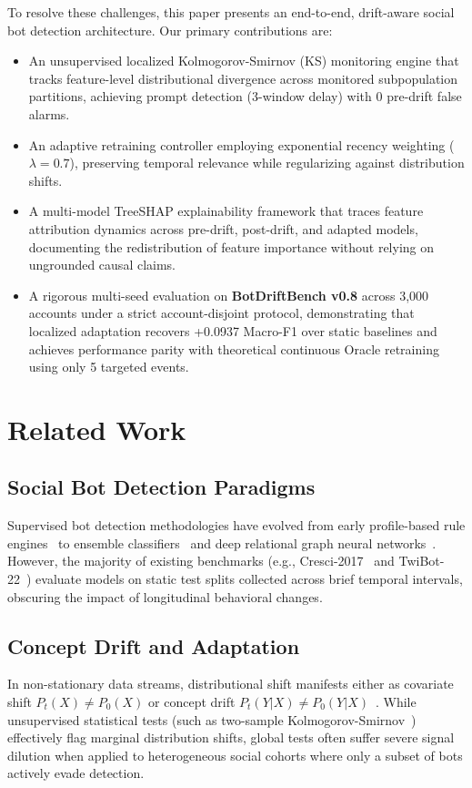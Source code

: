 \documentclass[journal]{IEEEtran}
\begin{document}
To resolve these challenges, this paper presents an end-to-end, drift-aware social bot detection architecture. Our primary contributions are:
\begin{itemize}
    \item An unsupervised localized Kolmogorov-Smirnov (KS) monitoring engine that tracks feature-level distributional divergence across monitored subpopulation partitions, achieving prompt detection (3-window delay) with 0 pre-drift false alarms.
    \item An adaptive retraining controller employing exponential recency weighting ($\lambda = 0.7$), preserving temporal relevance while regularizing against distribution shifts.
    \item A multi-model TreeSHAP explainability framework that traces feature attribution dynamics across pre-drift, post-drift, and adapted models, documenting the redistribution of feature importance without relying on ungrounded causal claims.
    \item A rigorous multi-seed evaluation on \textbf{BotDriftBench v0.8} across 3,000 accounts under a strict account-disjoint protocol, demonstrating that localized adaptation recovers +0.0937 Macro-F1 over static baselines and achieves performance parity with theoretical continuous Oracle retraining using only 5 targeted events.
\end{itemize}

\section{Related Work}
\subsection{Social Bot Detection Paradigms}
Supervised bot detection methodologies have evolved from early profile-based rule engines~\cite{varol2017online} to ensemble classifiers~\cite{chen2016xgboost} and deep relational graph neural networks~\cite{feng2021botrgcn,feng2022twibot}. However, the majority of existing benchmarks (e.g., Cresci-2017~\cite{cresci2017paradigm} and TwiBot-22~\cite{feng2022twibot}) evaluate models on static test splits collected across brief temporal intervals, obscuring the impact of longitudinal behavioral changes.

\subsection{Concept Drift and Adaptation}
In non-stationary data streams, distributional shift manifests either as covariate shift $P_t(X) \neq P_0(X)$ or concept drift $P_t(Y|X) \neq P_0(Y|X)$~\cite{gama2014survey,lu2018learning}. While unsupervised statistical tests (such as two-sample Kolmogorov-Smirnov~\cite{massey1951kolmogorov}) effectively flag marginal distribution shifts, global tests often suffer severe signal dilution when applied to heterogeneous social cohorts where only a subset of bots actively evade detection.
\end{document}
